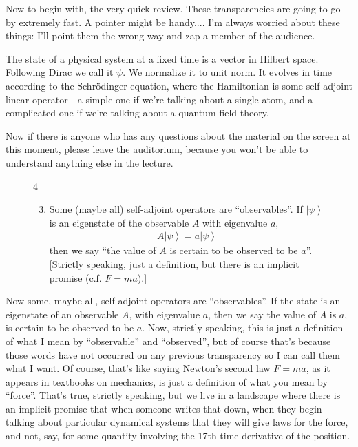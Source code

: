 \documentclass[twocolumn,prb]{revtex4}
\newcommand{\ket}[1]{\left|#1\right\rangle}
\begin{document}
Now to begin with, the very quick review. These transparencies are going to go by extremely fast. A pointer might be handy.... I'm always worried about these things: I'll point them the wrong way and zap a member of the audience. %

The state of a physical system at a fixed time is a vector in Hilbert space. Following Dirac we call it $\psi$. We normalize it to unit norm. It evolves in time according to the Schrödinger equation, where the Hamiltonian is some self-adjoint linear operator---a simple one if we're talking about a single atom, and a complicated one if we're talking about a quantum field theory.

Now if there is anyone who has any questions about the material on the screen at this moment, please leave the auditorium, because you won't be able to understand anything else in the lecture.

\begin{figure}[htb] 
\begin{mdframed}
  \vspace{5pt}\hfill 4\\[-18pt]
  \begin{raggedright}
  \begin{enumerate}[label=(\roman*)]
    \setcounter{enumi}{2}
  \item Some (maybe all) self-adjoint operators are ``observables''.  If 
    $\ket{\psi}$ is an eigenstate of the observable $A$ with eigenvalue $a$,
    \begin{align}
      \nonumber
      A\ket{\psi} = a\ket{\psi}
    \end{align}
    then we say ``the value of $A$ is certain to be observed to be
    $a$''.\\[6pt]

    [Strictly speaking, just a definition, but there is an implicit
      promise (c.f. $F=ma$).]
  \end{enumerate}
  \end{raggedright}
  \vspace{6pt}
\end{mdframed}
\end{figure}

Now some, maybe all, self-adjoint operators are ``observables''. If the state is an eigenstate of an observable $A$, with eigenvalue $a$, then we say the value of $A$ is $a$, is certain to be observed to be $a$. Now, strictly speaking, this is just a definition of what I mean by ``observable'' and ``observed'', but of course that's because those words have not occurred on any previous transparency so I can call them what I want. Of course, that's like saying Newton's second law
$F = ma$, as it appears in textbooks on mechanics, is just a definition of what you mean by ``force''. That's true, strictly speaking, but we live in a landscape where there is an implicit promise that when someone writes that down, when they begin talking about particular dynamical systems that they will give laws for the force, and not, say, for some quantity involving the 17th time derivative of the position.
\end{document}
